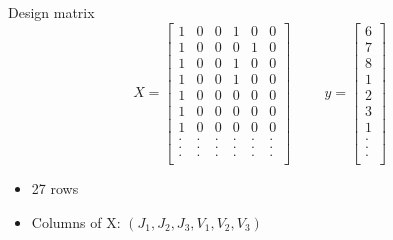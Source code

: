 \documentclass[unknownkeysallowed]{beamer}
\begin{document}
\begin{frame}{Design matrix}
$$X=\left[\begin{array}{llllll}
1 & 0 & 0 & 1 & 0 & 0\\
1 & 0 & 0 & 0 & 1 & 0\\
1 & 0 & 0 & 1 & 0 & 0\\
1 & 0 & 0 & 1 & 0 & 0\\
1 & 0 & 0 & 0 & 0 & 0\\
1 & 0 & 0 & 0 & 0 & 0\\
1 & 0 & 0 & 0 & 0 & 0\\
. & . & . & . & . & .\\
. & . & . & . & . & .\\
. & . & . & . & . & .\\
\end{array}\right]\hspace{1cm} y=\left[\begin{array}{l}
6\\
7\\
8\\
1\\
2\\
3\\
1\\
.\\
.\\
.\\
\end{array}\right]
$$
\begin{itemize}
    \item 27 rows
    \item Columns of X: $(J_1,J_2,J_3,V_1,V_2,V_3)$
\end{itemize}
\end{frame}
\end{document}
